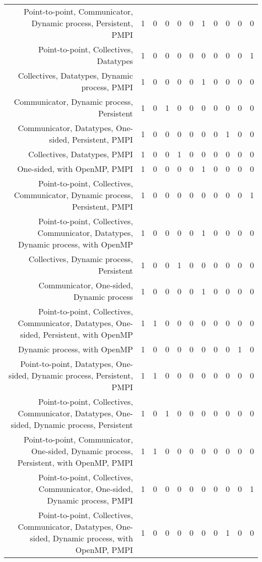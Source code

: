 {\begin{landscape}
\begin{longtable}[htb]{r|c|c|c|c|c|c|c|c|c|c}
{Point-to-point, Communicator, Dynamic process, Persistent, PMPI} & 1 & 0 & 0 & 0 & 0 & 1 & 0 & 0 & 0 & 0 \\%
{Point-to-point, Collectives, Datatypes} & 1 & 0 & 0 & 0 & 0 & 0 & 0 & 0 & 0 & 1 \\%
{Collectives, Datatypes, Dynamic process, PMPI} & 1 & 0 & 0 & 0 & 0 & 1 & 0 & 0 & 0 & 0 \\%
{Communicator, Dynamic process, Persistent} & 1 & 0 & 1 & 0 & 0 & 0 & 0 & 0 & 0 & 0 \\%
{Communicator, Datatypes, One-sided, Persistent, PMPI} & 1 & 0 & 0 & 0 & 0 & 0 & 0 & 1 & 0 & 0 \\%
{Collectives, Datatypes, PMPI} & 1 & 0 & 0 & 1 & 0 & 0 & 0 & 0 & 0 & 0 \\%
{One-sided, with OpenMP, PMPI} & 1 & 0 & 0 & 0 & 0 & 1 & 0 & 0 & 0 & 0 \\%
{Point-to-point, Collectives, Communicator, Dynamic process, Persistent, PMPI} & 1 & 0 & 0 & 0 & 0 & 0 & 0 & 0 & 0 & 1 \\%
{Point-to-point, Collectives, Communicator, Datatypes, Dynamic process, with OpenMP} & 1 & 0 & 0 & 0 & 0 & 1 & 0 & 0 & 0 & 0 \\%
{Collectives, Dynamic process, Persistent} & 1 & 0 & 0 & 1 & 0 & 0 & 0 & 0 & 0 & 0 \\%
{Communicator, One-sided, Dynamic process} & 1 & 0 & 0 & 0 & 0 & 1 & 0 & 0 & 0 & 0 \\%
{Point-to-point, Collectives, Communicator, Datatypes, One-sided, Persistent, with OpenMP} & 1 & 1 & 0 & 0 & 0 & 0 & 0 & 0 & 0 & 0 \\%
{Dynamic process, with OpenMP} & 1 & 0 & 0 & 0 & 0 & 0 & 0 & 0 & 1 & 0 \\%
{Point-to-point, Datatypes, One-sided, Dynamic process, Persistent, PMPI} & 1 & 1 & 0 & 0 & 0 & 0 & 0 & 0 & 0 & 0 \\%
{Point-to-point, Collectives, Communicator, Datatypes, One-sided, Dynamic process, Persistent} & 1 & 0 & 1 & 0 & 0 & 0 & 0 & 0 & 0 & 0 \\%
{Point-to-point, Communicator, One-sided, Dynamic process, Persistent, with OpenMP, PMPI} & 1 & 1 & 0 & 0 & 0 & 0 & 0 & 0 & 0 & 0 \\%
{Point-to-point, Collectives, Communicator, One-sided, Dynamic process, PMPI} & 1 & 0 & 0 & 0 & 0 & 0 & 0 & 0 & 0 & 1 \\%
{Point-to-point, Collectives, Communicator, Datatypes, One-sided, Dynamic process, with OpenMP, PMPI} & 1 & 0 & 0 & 0 & 0 & 0 & 0 & 1 & 0 & 0 \\%

\end{longtable}
\end{landscape}}
